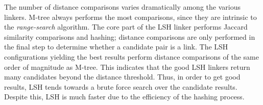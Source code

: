 \documentclass{llncs}
\begin{document}
The number of distance comparisons varies dramatically among the various
linkers. M-tree always performs the most comparisons, since they are
intrinsic to the \emph{range-search} algorithm. The core part of the LSH
linker performs Jaccard similarity comparisons and hashing; distance
comparisons are only performed in the final step to determine whether a
candidate pair is a link. The LSH configurations yielding the best
results perform distance comparisons of the same order of magnitude as
M-tree. This indicates that the good LSH linkers return many candidates
beyond the distance threshold. Thus, in order to get good results, LSH
tends towards a brute force search over the candidate results. Despite
this, LSH is much faster due to the efficiency of the hashing process.

\end{document}
